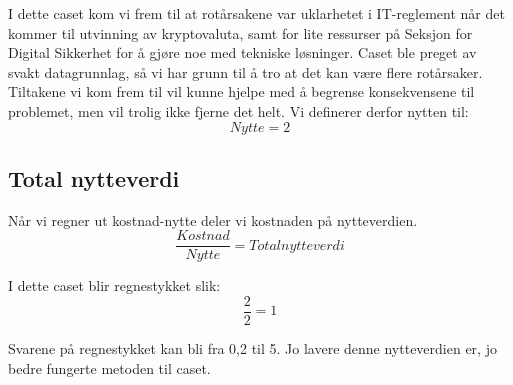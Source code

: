 I dette caset kom vi frem til at rotårsakene var uklarhetet i IT-reglement når det kommer til utvinning av kryptovaluta, samt for lite ressurser på Seksjon for Digital Sikkerhet for å gjøre noe med tekniske løsninger. Caset ble preget av svakt datagrunnlag, så vi har grunn til å tro at det kan være flere rotårsaker. Tiltakene vi kom frem til vil kunne hjelpe med å begrense konsekvensene til problemet, men vil trolig ikke fjerne det helt. Vi definerer derfor nytten til:
\[Nytte = 2\]

\subsection{Total nytteverdi}
Når vi regner ut kostnad-nytte deler vi kostnaden på nytteverdien. 
\[\frac{Kostnad}{Nytte} = Total nytteverdi\]

I dette caset blir regnestykket slik:
\[\frac{2}{2} = 1\]

Svarene på regnestykket kan bli fra 0,2 til 5. Jo lavere denne nytteverdien er, jo bedre fungerte metoden til caset. 